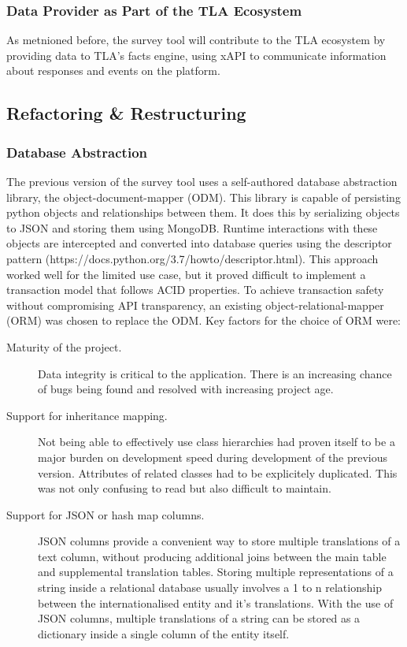      \subsubsection{Data Provider as Part of the TLA Ecosystem}
     As metnioned before, the survey tool will contribute to the TLA ecosystem
     by providing data to TLA's facts engine, using xAPI to communicate
     information about responses and events on the platform.

\subsection{Refactoring \& Restructuring}
\subsubsection{Database Abstraction}
The previous version of the survey tool uses a self-authored database abstraction library,
the object-document-mapper (ODM). This library is capable of persisting python objects
and relationships between them. It does this by serializing objects to JSON and storing them
using MongoDB. Runtime interactions with these objects are intercepted and converted into 
database queries using the descriptor pattern (https://docs.python.org/3.7/howto/descriptor.html).
This approach worked well for the limited use case, but it proved difficult to implement
a transaction model that follows ACID properties.
To achieve transaction safety without compromising API transparency, an existing
object-relational-mapper (ORM) was chosen to replace the ODM. Key factors for the choice
of ORM were:

\begin{description}
    \item[Maturity of the project.] Data integrity is critical to the application. There is an
    increasing chance of bugs being found and resolved with increasing project age.
    \item[Support for inheritance mapping.] Not being able to effectively use class hierarchies 
    had proven itself to be a major burden on development speed during development of the previous
    version. Attributes of related classes had to be explicitely duplicated. 
    This was not only confusing to read but also difficult to maintain. 
    \item[Support for JSON or hash map columns.] JSON columns provide a convenient way to store multiple 
    translations of a text column, without producing additional joins between the main table and
    supplemental translation tables. Storing multiple representations of a string
    inside a relational database usually involves a 1 to n relationship between
    the internationalised entity and it's translations. With the use of JSON columns,
    multiple translations of a string can be stored as a dictionary inside a single
    column of the entity itself.
\end{description}

